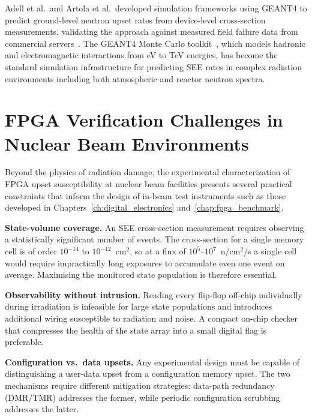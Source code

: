 Adell et al.\ and Artola et al.\ developed simulation frameworks
using GEANT4 to predict ground-level neutron upset rates from
device-level cross-section measurements, validating the approach
against measured field failure data from commercial
servers~\cite{adell2008assessing,artola2021benchmarks}.  The
GEANT4 Monte Carlo toolkit~\cite{agostinelli2003geant4}, which
models hadronic and electromagnetic interactions from eV to TeV
energies, has become the standard simulation infrastructure for
predicting SEE rates in complex radiation environments including
both atmospheric and reactor neutron spectra.

\section{FPGA Verification Challenges in Nuclear Beam Environments}
\label{sec:verification_challenges}

Beyond the physics of radiation damage, the experimental
characterization of FPGA upset susceptibility at nuclear beam
facilities presents several practical constraints that inform the
design of in-beam test instruments such as those developed in
Chapters~\ref{ch:digital_electronics} and~\ref{chap:fpga_benchmark}.

\textbf{State-volume coverage.}  An SEE cross-section measurement
requires observing a statistically significant number of events.  The
cross-section for a single memory cell is of order $10^{-14}$ to
$10^{-12}$~cm$^2$, so at a flux of $10^5$--$10^7$~n/cm$^2$/s a single
cell would require impractically long exposures to accumulate even one
event on average.  Maximising the monitored state population is
therefore essential.

\textbf{Observability without intrusion.}  Reading every flip-flop
off-chip individually during irradiation is infeasible for large state
populations and introduces additional wiring susceptible to radiation
and noise.  A compact on-chip checker that compresses the health of
the state array into a small digital flag is preferable.

\textbf{Configuration vs.\ data upsets.}  Any experimental design must
be capable of distinguishing a user-data upset from a configuration
memory upset.  The two mechanisms require different mitigation
strategies: data-path redundancy (DMR/TMR) addresses the former, while
periodic configuration scrubbing addresses the latter.

